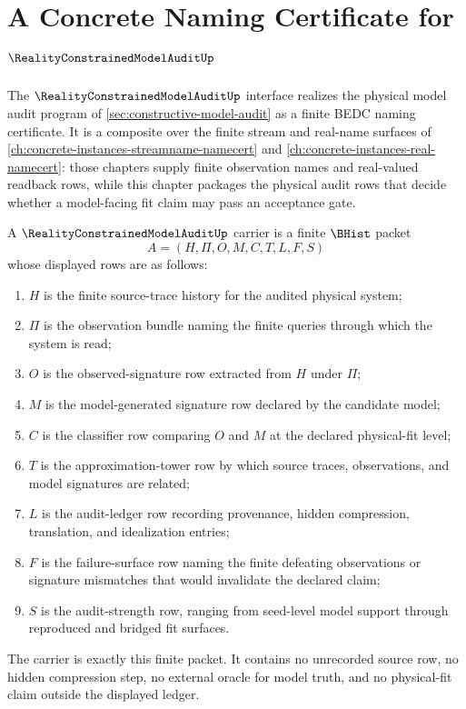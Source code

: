 \chapter{A Concrete Naming Certificate for $\RealityConstrainedModelAuditUp$}
\label{ch:concrete-instances-reality-constrained-model-audit-namecert}

The $\RealityConstrainedModelAuditUp$ interface realizes the physical model audit program of \autoref{sec:constructive-model-audit} as a finite BEDC naming certificate. It is a composite over the finite stream and real-name surfaces of \autoref{ch:concrete-instances-streamname-namecert} and \autoref{ch:concrete-instances-real-namecert}: those chapters supply finite observation names and real-valued readback rows, while this chapter packages the physical audit rows that decide whether a model-facing fit claim may pass an acceptance gate.

\begin{definition}
\label{def:reality-constrained-model-audit-carrier}
A $\RealityConstrainedModelAuditUp$ carrier is a finite $\BHist$ packet
$$
A=(H,\Pi,O,M,C,T,L,F,S)
$$
whose displayed rows are as follows:
\begin{enumerate}
\item $H$ is the finite source-trace history for the audited physical system;
\item $\Pi$ is the observation bundle naming the finite queries through which the system is read;
\item $O$ is the observed-signature row extracted from $H$ under $\Pi$;
\item $M$ is the model-generated signature row declared by the candidate model;
\item $C$ is the classifier row comparing $O$ and $M$ at the declared physical-fit level;
\item $T$ is the approximation-tower row by which source traces, observations, and model signatures are related;
\item $L$ is the audit-ledger row recording provenance, hidden compression, translation, and idealization entries;
\item $F$ is the failure-surface row naming the finite defeating observations or signature mismatches that would invalidate the declared claim;
\item $S$ is the audit-strength row, ranging from seed-level model support through reproduced and bridged fit surfaces.
\end{enumerate}
The carrier is exactly this finite packet. It contains no unrecorded source row, no hidden compression step, no external oracle for model truth, and no physical-fit claim outside the displayed ledger.
\end{definition}

